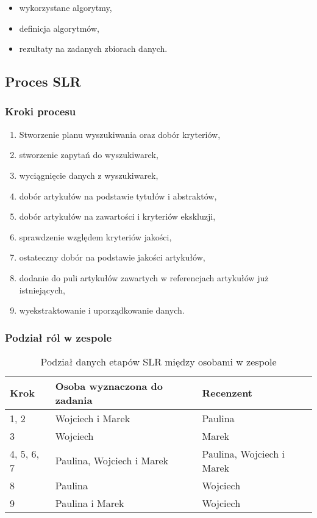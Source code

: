 \documentclass[polish,envcountsect,10pt]{article}
\begin{document}
\begin{itemize}
	\item wykorzystane algorytmy,
	\item definicja algorytmów,
	\item rezultaty na zadanych zbiorach danych.
\end{itemize}

\subsection{Proces SLR}

\subsubsection{Kroki procesu}

\begin{enumerate}
	\item Stworzenie planu wyszukiwania oraz dobór kryteriów,
	\item stworzenie zapytań do wyszukiwarek,
	\item wyciągnięcie danych z wyszukiwarek,
	\item dobór artykułów na podstawie tytułów i abstraktów,
	\item dobór artykułów na zawartości i kryteriów ekskluzji,
	\item sprawdzenie względem kryteriów jakości,
	\item ostateczny dobór na podstawie jakości artykułów,
	\item dodanie do puli artykułów zawartych w referencjach artykułów już istniejących,
	\item wyekstraktowanie i uporządkowanie danych.
\end{enumerate}

\subsubsection{Podział ról w zespole}

\begin{table}[H]
    \caption{Podział danych etapów SLR między osobami w zespole}
    \centering
    \begin{tabular}{|p{1.5cm}|p{5cm}|p{5cm}|}
        \hline
        Krok & Osoba wyznaczona do zadania & Recenzent\\
        \hline
        1, 2 & Wojciech i Marek  & Paulina\\
        \hline
        3 & Wojciech & Marek\\
        \hline
        4, 5, 6, 7 & Paulina, Wojciech i Marek & Paulina, Wojciech i Marek\\
        \hline
        8 & Paulina & Wojciech\\
        \hline
        9 & Paulina i Marek & Wojciech\\
        \hline
    \end{tabular}
\end{table}
\end{document}
